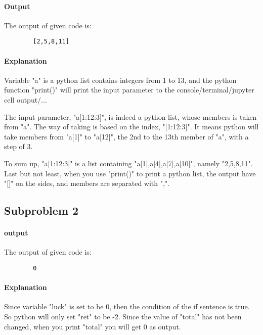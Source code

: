 \documentclass{article}
\theoremstyle{break}
\begin{document}
    \paragraph{Output}\par
    The output of given code is:
    \begin{lstlisting}
        [2,5,8,11]
    \end{lstlisting}
    \paragraph{Explanation}\par
    Variable "a" is a python list contains integers from 1 to 13, and the python function "print()" will print the input parameter to the console/terminal/jupyter cell output/... \par
    The input parameter, "a[1:12:3]", is indeed a python list,
    whose members is taken from "a". The way of taking is based on the index, "[1:12:3]". It means python will take members from "a[1]" to "a[12]", the 2nd to the 13th member of "a", with a step of 3. \par
    To sum up, "a[1:12:3]" is a list containing "a[1],a[4],a[7],a[10]", namely "2,5,8,11". Last but not least, when you use "print()" to print a python list, the output have "[]" on the sides, and members are separated with ",".
    \subsection{Subproblem 2}
    \paragraph{output}\par
    The output of given code is:
    \begin{lstlisting}
        0
    \end{lstlisting}
    \paragraph{Explanation}\par
    Since variable "luck" is set to be 0, then the condition of the if sentence is true. So python will only set "ret" to be -2. Since the value of "total" has not been changed, when you print "total" you will get 0 as output.
\end{document}
